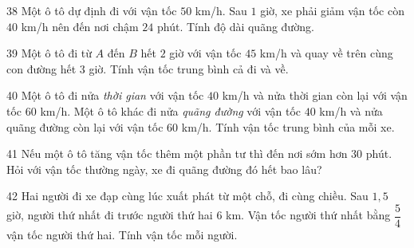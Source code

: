 \gap
\begin{probbox}{38}{}
Một ô tô dự định đi với vận tốc $50$ km/h. Sau $1$ giờ, xe phải giảm vận tốc còn $40$ km/h nên đến nơi chậm $24$ phút. Tính độ dài quãng đường.
\end{probbox}
\gap
\begin{probbox}{39}{}
Một ô tô đi từ $A$ đến $B$ hết $2$ giờ với vận tốc $45$ km/h và quay về trên cùng con đường hết $3$ giờ. Tính vận tốc trung bình cả đi và về.
\end{probbox}
\gap
\begin{probbox}{40}{}
 Một ô tô đi nửa \emph{thời gian} với vận tốc $40$ km/h và nửa thời gian còn lại với vận tốc $60$ km/h.  Một ô tô khác đi nửa \emph{quãng đường} với vận tốc $40$ km/h và nửa quãng đường còn lại với vận tốc $60$ km/h. Tính vận tốc trung bình của mỗi xe.
\end{probbox}
\gap
\begin{probbox}{41}{}
Nếu một ô tô tăng vận tốc thêm một phần tư thì đến nơi sớm hơn $30$ phút. Hỏi với vận tốc thường ngày, xe đi quãng đường đó hết bao lâu?
\end{probbox}
\gap
\begin{probbox}{42}{}
Hai người đi xe đạp cùng lúc xuất phát từ một chỗ, đi cùng chiều. Sau $1{,}5$ giờ, người thứ nhất đi trước người thứ hai $6$ km. Vận tốc người thứ nhất bằng $\dfrac54$ vận tốc người thứ hai. Tính vận tốc mỗi người.
\end{probbox}
